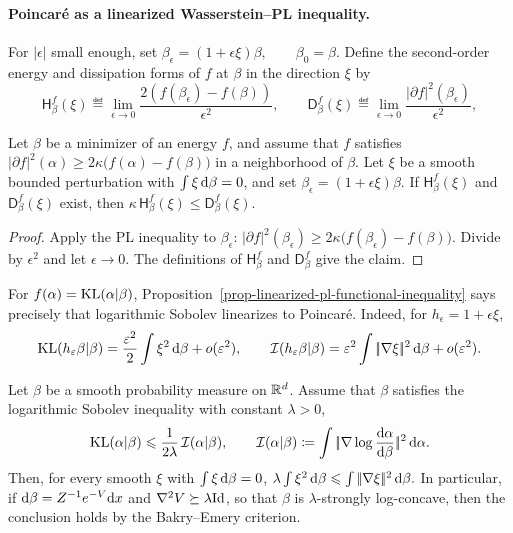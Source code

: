 \paragraph{Poincar\'e as a linearized Wasserstein--PL inequality.}
For \(|\epsilon|\) small enough, set
\(\beta_\epsilon=(1+\epsilon\xi)\beta, \qquad \beta_0=\beta.\)
Define the second-order energy and dissipation forms of \(f\) at \(\beta\) in the direction \(\xi\) by
\[
\mathsf H^f_\beta(\xi)
\eqdef
\lim_{\epsilon\to0}
\frac{2(f(\beta_\epsilon)-f(\beta))}{\epsilon^2},
\qquad
\mathsf D^f_\beta(\xi)
\eqdef
\lim_{\epsilon\to0}
\frac{|\partial f|^2(\beta_\epsilon)}{\epsilon^2},
\]
\begin{prop}\label{prop-linearized-pl-functional-inequality}
Let \(\beta\) be a minimizer of an energy \(f\), and assume that \(f\) satisfies \(|\partial f|^2(\alpha) \geq 2\kappa\bigl(f(\alpha)-f(\beta)\bigr)\)
in a neighborhood of \(\beta\). Let \(\xi\) be a smooth bounded perturbation with \(\int\xi\,\mathrm{d}\beta=0\), and set \(\beta_\epsilon=(1+\epsilon\xi)\beta\). If \(\mathsf H^f_\beta(\xi)\) and \(\mathsf D^f_\beta(\xi)\) exist, then
\(\kappa\,\mathsf H^f_\beta(\xi) \leq \mathsf D^f_\beta(\xi).\)
\end{prop}
\begin{proof}
Apply the PL inequality to \(\beta_\epsilon\): \(|\partial f|^2(\beta_\epsilon) \geq 2\kappa\bigl(f(\beta_\epsilon)-f(\beta)\bigr).\)
Divide by \(\epsilon^2\) and let \(\epsilon\to0\). The definitions of \(\mathsf H^f_\beta\) and \(\mathsf D^f_\beta\) give the claim.
\end{proof}
For \(f(\alpha)=\operatorname{KL}(\alpha|\beta)\), Proposition~\ref{prop-linearized-pl-functional-inequality} says precisely that logarithmic Sobolev linearizes to Poincar\'e. Indeed, for \(h_\epsilon=1+\epsilon\xi\),
\[
\operatorname{KL}(h_\varepsilon\beta|\beta)
=
\frac{\varepsilon^2}{2}\int\xi^2\,\mathrm{d}\beta+o(\varepsilon^2),
\qquad
\mathcal I(h_\varepsilon\beta|\beta)
=
\varepsilon^2\int|\!| \nabla\xi |\!|^2\,\mathrm{d}\beta+o(\varepsilon^2).
\]
\begin{prop}\label{prop-poincare-linearized-wasserstein-pl}
Let \(\beta\) be a smooth probability measure on \(\mathbb{R}^d\). Assume that \(\beta\) satisfies the logarithmic Sobolev inequality with constant \(\lambda>0\),
\[
\operatorname{KL}(\alpha|\beta)
\leqslant
\frac{1}{2\lambda}\,\mathcal I(\alpha|\beta),
\qquad
\mathcal I(\alpha|\beta)
\coloneqq
\int|\!| \nabla\log\frac{\mathrm{d}\alpha}{\mathrm{d}\beta} |\!|^2\,\mathrm{d}\alpha.
\]
Then, for every smooth \(\xi\) with \(\int\xi\,\mathrm{d}\beta=0\), \(\lambda\int\xi^2\,\mathrm{d}\beta \leqslant \int|\!| \nabla\xi |\!|^2\,\mathrm{d}\beta.\)
In particular, if \(\mathrm{d}\beta=Z^{-1}e^{-V}\mathrm{d} x\) and \(\nabla^2 V\succeq \lambda\mathrm{Id}\), so that \(\beta\) is \(\lambda\)-strongly log-concave, then the conclusion holds by the Bakry--Emery criterion.
\end{prop}
